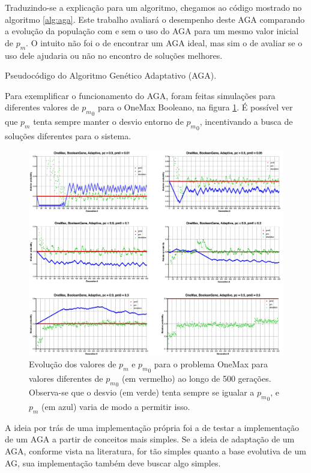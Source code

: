 Traduzindo-se a explicação para um algoritmo, chegamos ao código mostrado no algoritmo \ref{alg:aga}. Este trabalho avaliará o desempenho deste AGA comparando a evolução da população com e sem o uso do AGA para um mesmo valor inicial de $p_m$. O intuito não foi o de encontrar um AGA ideal, mas sim o de avaliar se o uso dele ajudaria ou não no encontro de soluções melhores.

\begin{algorithm}[ht]
\caption{Pseudocódigo do Algoritmo Genético Adaptativo (AGA).}
\label{alg:aga}
\end{algorithm}

Para exemplificar o funcionamento do AGA, foram feitas simulações para diferentes valores de ${p_m}_0$ para o OneMax Booleano, na figura \ref{fig:aga_test}. É possível ver que $p_m$ tenta sempre manter o desvio entorno de ${p_m}_0$, incentivando a busca de soluções diferentes para o sistema.

\begin{figure}[ht!]
    \centering \includegraphics[width=1.0\textwidth]{boolean_onemax_aga.jpg}
    \caption{Evolução dos valores de $p_m$ e ${p_m}_0$ para o problema OneMax para valores diferentes de ${p_m}_0$ (em vermelho) ao longo de 500 gerações. Observa-se que o desvio (em verde) tenta sempre se igualar a ${p_m}_0$, e $p_m$ (em azul) varia de modo a permitir isso.}
    \label{fig:aga_test}
\end{figure}

A ideia por trás de uma implementação própria foi a de testar a implementação de um AGA a partir de conceitos mais simples. Se a ideia de adaptação de um AGA, conforme vista na literatura, for tão simples quanto a base evolutiva de um AG, sua implementação também deve buscar algo simples.
